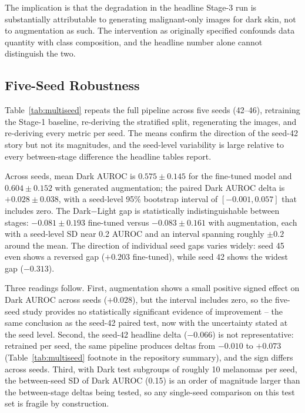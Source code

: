 The implication is that the degradation in the headline Stage-3 run is substantially attributable to generating malignant-only images for dark skin, not to augmentation as such. The intervention as originally specified confounds data quantity with class composition, and the headline number alone cannot distinguish the two.

\subsection{Five-Seed Robustness}
\label{sec:multiseed_results}

Table~\ref{tab:multiseed} repeats the full pipeline across five seeds (42--46), retraining the Stage-1 baseline, re-deriving the stratified split, regenerating the images, and re-deriving every metric per seed. The means confirm the direction of the seed-42 story but not its magnitudes, and the seed-level variability is large relative to every between-stage difference the headline tables report.

Across seeds, mean Dark AUROC is $0.575 \pm 0.145$ for the fine-tuned model and $0.604 \pm 0.152$ with generated augmentation; the paired Dark AUROC delta is $+0.028 \pm 0.038$, with a seed-level 95\% bootstrap interval of $[-0.001, 0.057]$ that includes zero. The Dark$-$Light gap is statistically indistinguishable between stages: $-0.081 \pm 0.193$ fine-tuned versus $-0.083 \pm 0.161$ with augmentation, each with a seed-level SD near 0.2 AUROC and an interval spanning roughly $\pm 0.2$ around the mean. The direction of individual seed gaps varies widely: seed 45 even shows a reversed gap ($+0.203$ fine-tuned), while seed 42 shows the widest gap ($-0.313$).

Three readings follow. First, augmentation shows a small positive signed effect on Dark AUROC across seeds ($+0.028$), but the interval includes zero, so the five-seed study provides no statistically significant evidence of improvement -- the same conclusion as the seed-42 paired test, now with the uncertainty stated at the seed level. Second, the seed-42 headline delta ($-0.066$) is not representative: retrained per seed, the same pipeline produces deltas from $-0.010$ to $+0.073$ (Table~\ref{tab:multiseed} footnote in the repository summary), and the sign differs across seeds. Third, with Dark test subgroups of roughly 10 melanomas per seed, the between-seed SD of Dark AUROC (0.15) is an order of magnitude larger than the between-stage deltas being tested, so any single-seed comparison on this test set is fragile by construction.

